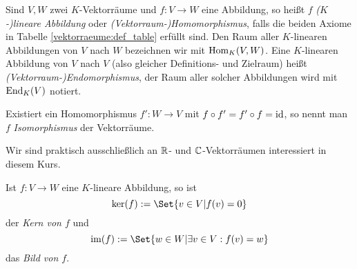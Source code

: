 \begin{definition}
Sind $V,W$ zwei $K$-Vektorräume und $f: V\to W$ eine Abbildung, so heißt $f$ \emph{($K$-)lineare Abbildung} oder \emph{(Vektorraum-)Homomorphismus}, falls die beiden Axiome in Tabelle \ref{vektorraeume:def_table} erfüllt sind. Den Raum aller $K$-linearen Abbildungen von $V$ nach $W$ bezeichnen wir mit $\operatorname{Hom}_K(V,W)$. Eine $K$-linearen Abbildung von $V$ nach $V$ (also gleicher Definitions- und Zielraum) heißt \emph{(Vektorraum-)Endomorphismus}, der Raum aller solcher Abbildungen wird mit $\operatorname{End}_K(V)$ notiert.

Existiert ein Homomorphismus $f': W\to V$ mit $f\circ f'=f'\circ f=\operatorname{id}$, so nennt man $f$ \emph{Isomorphismus} der Vektorräume.
\end{definition}

\begin{remark}
Wir sind praktisch ausschließlich an $\mathbb{R}$- und $\mathbb{C}$-Vektorräumen interessiert in diesem Kurs.
\end{remark}

\begin{definition}
Ist $f: V\to W$ eine $K$-lineare Abbildung, so ist
\[\ker(f) := \Set{v\in V | f(v)=0}\]
der \emph{Kern von $f$} und
\[\im(f) := \Set{w\in W | \exists v\in V: f(v)=w}\]
das \emph{Bild von $f$}.
\end{definition}